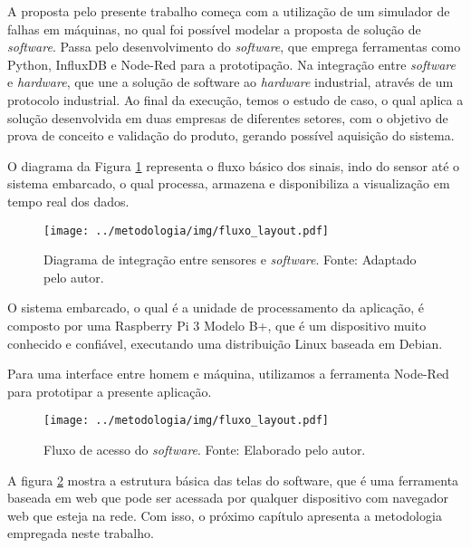 \documentclass[a4paper]{ifacconf}
\begin{document}
A proposta pelo presente trabalho começa com a utilização de um simulador de falhas em máquinas, no qual foi possível modelar a 
proposta de solução de \textit{software}. Passa pelo desenvolvimento do \textit{software}, que emprega ferramentas como Python, InfluxDB e 
Node-Red para a prototipação. 
Na integração entre \textit{software} e \textit{hardware}, que une a solução de software ao \textit{hardware} industrial, através de um 
protocolo industrial. Ao final da execução, temos o estudo de caso, o qual aplica a solução desenvolvida em duas empresas de diferentes setores,
com o objetivo de prova de conceito e validação do produto, gerando possível aquisição do sistema. 

O diagrama da Figura \ref{fig:fluxo_integracao} representa o fluxo básico dos sinais, indo do sensor até o sistema embarcado, o qual processa, armazena e 
disponibiliza a visualização em tempo real dos dados.

\begin{figure}[H]
  \begin{center}
      \texttt{[image: ../metodologia/img/fluxo\_layout.pdf]}
  \end{center}
  \caption{Diagrama de integração  entre sensores e \textit{software}. Fonte: Adaptado pelo autor.}
  \label{fig:fluxo_integracao}
\end{figure}

O sistema embarcado, o qual é a unidade de processamento da aplicação, é composto por uma Raspberry Pi 3 Modelo B+, que é um dispositivo muito 
conhecido e confiável, executando uma distribuição Linux baseada em Debian.

Para uma interface entre homem e máquina, utilizamos a ferramenta 
Node-Red para prototipar a presente aplicação.

\begin{figure}[H]
  \begin{center}
      \texttt{[image: ../metodologia/img/fluxo\_layout.pdf]}
  \end{center}
  \caption{Fluxo de acesso do \textit{software}. Fonte: Elaborado pelo autor.} 
  \label{fig:fluxo_software}
\end{figure}

A figura \ref{fig:fluxo_software} mostra a estrutura básica das telas do software, que é uma ferramenta 
baseada em web que pode ser acessada por qualquer dispositivo com navegador web que esteja na rede. Com isso, o próximo capítulo apresenta a
metodologia empregada neste trabalho.
\end{document}
